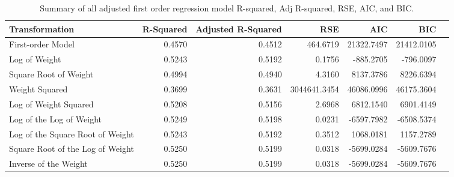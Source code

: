 \documentclass{article}\usepackage[]{graphicx}\usepackage[]{xcolor}
\begin{document}
\begin{table}[ht]
\centering
\begin{tabular}{lrrrrrr}
  \hline
  Transformation & R-Squared & Adjusted R-Squared & RSE & AIC & BIC\\ 
  \hline
   First-order Model & 0.4570 & 0.4512 & 464.6719 & 21322.7497 & 21412.0105 \\ 
   Log of Weight & 0.5243 & 0.5192 & 0.1756 & -885.2705 & -796.0097\\ 
   Square Root of Weight & 0.4994 & 0.4940 & 4.3160 & 8137.3786 & 8226.6394\\
   Weight Squared & 0.3699 & 0.3631 & 3044641.3454 & 46086.0996 & 46175.3604\\
   Log of Weight Squared & 0.5208 & 0.5156 & 2.6968 & 6812.1540 & 6901.4149\\
   Log of the Log of Weight & 0.5249 & 0.5198 & 0.0231 & -6597.7982 & -6508.5374\\
   Log of the Square Root of Weight & 0.5243 & 0.5192 & 0.3512 & 1068.0181 & 1157.2789\\
   Square Root of the Log of Weight & 0.5250 & 0.5199 & 0.0318 & -5699.0284 & -5609.7676\\
   Inverse of the Weight & 0.5250 & 0.5199 & 0.0318 & -5699.0284 & -5609.7676\\
   \hline
\end{tabular}
\caption{Summary of all adjusted first order regression model R-squared, Adj R-squared, RSE, AIC, and BIC.}
\end{table}
\end{document}
